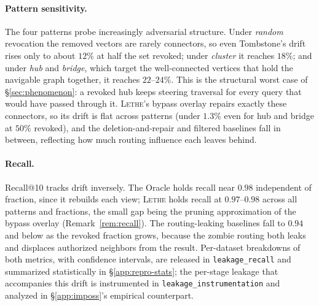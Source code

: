 \documentclass[sigconf, nonacm, review]{acmart}
\begin{document}
\paragraph{Pattern sensitivity.}
The four patterns probe increasingly adversarial structure. Under \emph{random}
revocation the removed vectors are rarely connectors, so even Tombstone's drift
rises only to about $12\%$ at half the set revoked; under \emph{cluster} it
reaches $18\%$; and under \emph{hub} and \emph{bridge}, which target the
well-connected vertices that hold the navigable graph together, it reaches
$22$--$24\%$. This is the structural worst case of \S\ref{sec:phenomenon}: a
revoked hub keeps steering traversal for every query that would have passed
through it. \textsc{Lethe}'s bypass overlay repairs exactly these connectors, so
its drift is flat across patterns (under $1.3\%$ even for hub and bridge at
$50\%$ revoked), and the deletion-and-repair and filtered baselines fall in
between, reflecting how much routing influence each leaves behind.

\paragraph{Recall.}
Recall@10 tracks drift inversely. The Oracle holds recall near $0.98$
independent of fraction, since it rebuilds each view; \textsc{Lethe} holds
recall at $0.97$--$0.98$ across all patterns and fractions, the small gap being
the pruning approximation of the bypass overlay (Remark~\ref{rem:recall}). The
routing-leaking baselines fall to $0.94$ and below as the revoked fraction
grows, because the zombie routing both leaks and displaces authorized neighbors
from the result. Per-dataset breakdowns of both metrics, with confidence
intervals, are released in \texttt{leakage\_recall} and summarized statistically
in \S\ref{app:repro-stats}; the per-stage leakage that accompanies this drift is
instrumented in \texttt{leakage\_instrumentation} and analyzed in
\S\ref{app:imposs}'s empirical counterpart.
\end{document}
